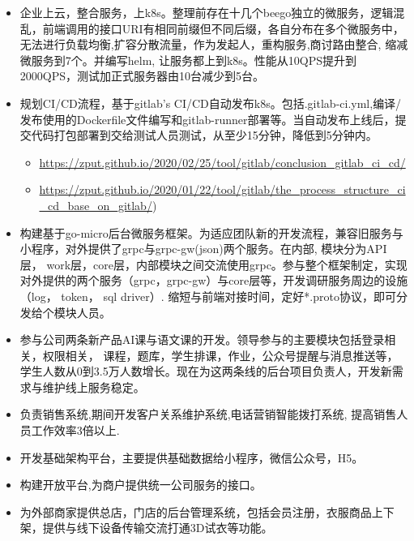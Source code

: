 \documentclass{resume}
\begin{document}
\begin{itemize}[parsep=0.2ex]
   \item 企业上云，整合服务，上k8s。整理前存在十几个beego独立的微服务，逻辑混乱，前端调用的接口URI有相同前缀但不同后缀，各自分布在多个微服务中，无法进行负载均衡,扩容分散流量，作为发起人，重构服务,商讨路由整合, 缩减微服务到7个。并编写helm, 让服务都上到k8s。性能从10QPS提升到2000QPS，测试加正式服务器由10台减少到5台。

   \item 规划CI/CD流程，基于gitlab's CI/CD自动发布k8s。包括.gitlab-ci.yml,编译/发布使用的Dockerfile文件编写和gitlab-runner部署等。当自动发布上线后，提交代码打包部署到交给测试人员测试，从至少15分钟，降低到5分钟内。
    \begin{itemize}[parsep=0.1ex]
      \item \url{https://zput.github.io/2020/02/25/tool/gitlab/conclusion_gitlab_ci_cd/}
      \item \url{https://zput.github.io/2020/01/22/tool/gitlab/the_process_structure_ci_cd_base_on_gitlab/})
    \end{itemize}

   \item 构建基于go-micro后台微服务框架。为适应团队新的开发流程，兼容旧服务与小程序，对外提供了grpc与grpc-gw(json)两个服务。在内部, 模块分为API层， work层，core层，内部模块之间交流使用grpc。参与整个框架制定，实现对外提供的两个服务（grpc，grpc-gw）与core层等，开发调研服务周边的设施（log， token， sql driver）. 缩短与前端对接时间，定好*.proto协议，即可分发给个模块人员。

   \item  参与公司两条新产品AI课与语文课的开发。领导参与的主要模块包括登录相关，权限相关， 课程，题库，学生排课，作业，公众号提醒与消息推送等，学生人数从0到3.5万人数增长。现在为这两条线的后台项目负责人，开发新需求与维护线上服务稳定。

   \item  负责销售系统,期间开发客户关系维护系统,电话营销智能拨打系统, 提高销售人员工作效率3倍以上.
\end{itemize}

\begin{itemize}[parsep=0.2ex]
  \item 开发基础架构平台，主要提供基础数据给小程序，微信公众号，H5。
  \item 构建开放平台,为商户提供统一公司服务的接口。
  \item 为外部商家提供总店，门店的后台管理系统，包括会员注册，衣服商品上下架，提供与线下设备传输交流打通3D试衣等功能。
\end{itemize}
\end{document}
